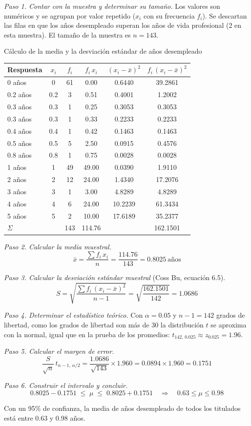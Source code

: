 \textit{Paso 1. Contar con la muestra y determinar su tamaño.} Los valores son numéricos y se agrupan por valor repetido ($x_i$ con su frecuencia $f_i$). Se descartan las filas en que los años desempleado superan los años de vida profesional (2 en esta muestra). El tamaño de la muestra es $n = 143$.

\begin{mitabla}{Cálculo de la media y la desviación estándar de años desempleado}
\begin{tabular}{lccccc}
\toprule
Respuesta & $x_i$ & $f_i$ & $f_i\,x_i$ & $(x_i-\bar{x})^2$ & $f_i\,(x_i-\bar{x})^2$ \\
\midrule
0 años & 0 & 61 & 0.00 & 0.6440 & 39.2861 \\
0.2 años & 0.2 & 3 & 0.51 & 0.4001 & 1.2002 \\
0.3 años & 0.3 & 1 & 0.25 & 0.3053 & 0.3053 \\
0.3 años & 0.3 & 1 & 0.33 & 0.2233 & 0.2233 \\
0.4 años & 0.4 & 1 & 0.42 & 0.1463 & 0.1463 \\
0.5 años & 0.5 & 5 & 2.50 & 0.0915 & 0.4576 \\
0.8 años & 0.8 & 1 & 0.75 & 0.0028 & 0.0028 \\
1 años & 1 & 49 & 49.00 & 0.0390 & 1.9110 \\
2 años & 2 & 12 & 24.00 & 1.4340 & 17.2076 \\
3 años & 3 & 1 & 3.00 & 4.8289 & 4.8289 \\
4 años & 4 & 6 & 24.00 & 10.2239 & 61.3434 \\
5 años & 5 & 2 & 10.00 & 17.6189 & 35.2377 \\
\midrule
$\Sigma$ & & 143 & 114.76 & & 162.1501 \\
\bottomrule
\end{tabular}
\end{mitabla}

\textit{Paso 2. Calcular la media muestral.}
\[
\bar{x} = \frac{\sum f_i\,x_i}{n} = \frac{114.76}{143} = 0.8025\ \text{años}
\]

\textit{Paso 3. Calcular la desviación estándar muestral} (Coss Bu, ecuación 6.5).
\[
S = \sqrt{\frac{\sum f_i\,(x_i-\bar{x})^2}{n-1}} = \sqrt{\frac{162.1501}{142}} = 1.0686
\]

\textit{Paso 4. Determinar el estadístico teórico.} Con $\alpha = 0.05$ y $n-1 = 142$ grados de libertad, como los grados de libertad son más de 30 la distribución $t$ se aproxima con la normal, igual que en la prueba de los promedios: $t_{142,\,0.025} \approx z_{0.025} = 1.96$.

\textit{Paso 5. Calcular el margen de error.}
\[
\frac{S}{\sqrt{n}}\,t_{n-1,\,\alpha/2} = \frac{1.0686}{\sqrt{143}}\times 1.960 = 0.0894 \times 1.960 = 0.1751
\]

\textit{Paso 6. Construir el intervalo y concluir.}
\[
0.8025 - 0.1751 \;\le\; \mu \;\le\; 0.8025 + 0.1751 \quad\Longrightarrow\quad 0.63 \le \mu \le 0.98
\]

Con un 95\% de confianza, la media de años desempleado de todos los titulados está entre 0.63 y 0.98 años.

